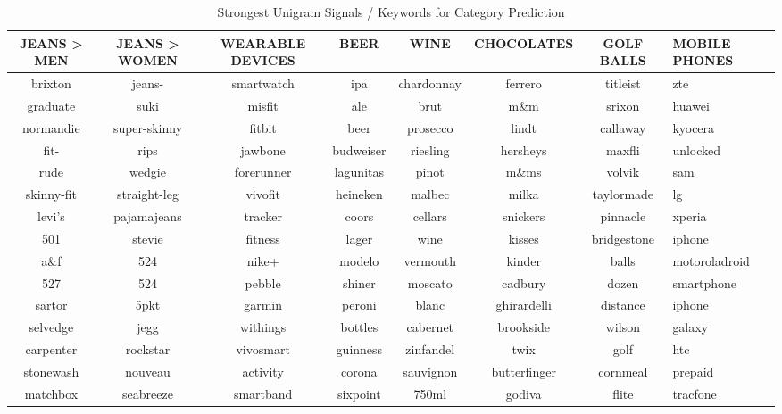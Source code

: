\begin{table}
  \caption{Strongest Unigram Signals / Keywords for Category Prediction}
  \label{tab:features}
  \begin{tabular}{cccccccl}
    \toprule
    JEANS > MEN	&	JEANS > WOMEN	&	WEARABLE DEVICES	&	 BEER	&	 WINE	&	CHOCOLATES	&	 GOLF BALLS	 & MOBILE PHONES \\
    \midrule
    brixton	&	jeans-	&	smartwatch	&	ipa	&	chardonnay	&	ferrero	&	titleist	&	zte	\\
    graduate	&	suki	&	misfit	&	ale	&	brut	&	m\&m	&	srixon	&	huawei	\\
    normandie	&	super-skinny	&	fitbit	&	beer	&	prosecco	&	lindt	&	callaway	&	kyocera	\\
    fit-	&	rips	&	jawbone	&	budweiser	&	riesling	&	hersheys	&	maxfli	&	unlocked	\\
    rude	&	wedgie	&	forerunner	&	lagunitas	&	pinot	&	m\&ms	&	volvik	&	sam	\\
    skinny-fit	&	straight-leg &	vivofit	&	heineken	&	malbec	&	milka	&	taylormade	&	lg	\\
    levi's\textregistered	&	pajamajeans	&	tracker	&	coors	&	cellars	&	snickers	&	pinnacle	&	xperia	\\
    501	&	stevie	&	fitness	&	lager	&	wine	&	kisses	&	bridgestone	&	iphone	\\
    a\&f	&	524\texttrademark	&	nike+	&	modelo	&	vermouth	&	kinder	&	balls	&	motoroladroid	\\
    527	&	524	&	pebble	&	shiner	&	moscato	&	cadbury	&	dozen	&	smartphone	\\
    sartor	&	5pkt	&	garmin	&	peroni	&	blanc	&	ghirardelli	&	distance	&	 iphone\textregistered	\\
    selvedge	&	jegg	&	withings	&	bottles	&	cabernet	&	brookside	&	wilson	&	galaxy	\\
    carpenter	&	rockstar	&	vivosmart	&	guinness	&	zinfandel	&	twix	&	golf	&	htc	\\
    stonewash	&	nouveau	&	activity	&	corona	&	sauvignon	&	butterfinger	&	cornmeal	&	prepaid	\\
    matchbox	&	seabreeze	&	smartband	&	sixpoint	&	750ml	&	godiva	&	flite	&	tracfone \\
    \bottomrule
  \end{tabular}
\end{table}


